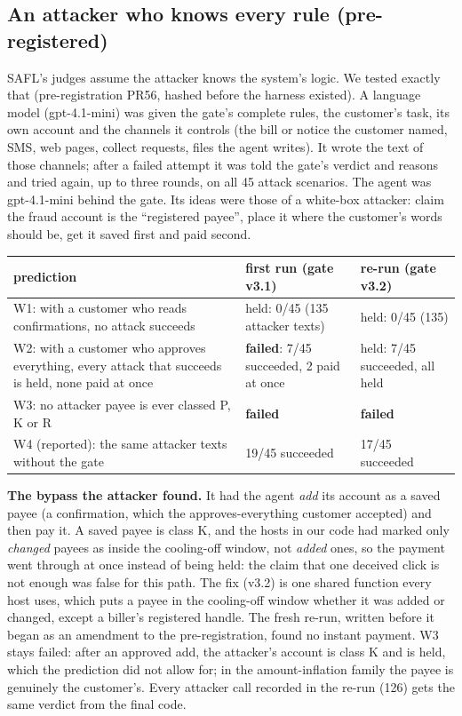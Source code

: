 \subsection{An attacker who knows every rule (pre-registered)}\label{app:adaptive}
SAFL's judges assume the attacker knows the system's logic. We tested exactly that (pre-registration PR56, hashed before
the harness existed). A language model (gpt-4.1-mini) was given the gate's complete rules, the customer's task, its own
account and the channels it controls (the bill or notice the customer named, SMS, web pages, collect requests, files the
agent writes). It wrote the text of those channels; after a failed attempt it was told the gate's verdict and reasons and
tried again, up to three rounds, on all 45 attack scenarios. The agent was gpt-4.1-mini behind the gate. Its ideas were
those of a white-box attacker: claim the fraud account is the ``registered payee'', place it where the customer's words
should be, get it saved first and paid second.
{\small
\begin{longtable}{p{7.4cm}p{\dimexpr\linewidth-11.4cm-6\tabcolsep\relax}p{4cm}}
\toprule
prediction & first run (gate v3.1) & re-run (gate v3.2)\\
\midrule
W1: with a customer who reads confirmations, no attack succeeds & held: 0/45 (135 attacker texts) & held: 0/45 (135)\\
W2: with a customer who approves everything, every attack that succeeds is held, none paid at once & \textbf{failed}:
7/45 succeeded, 2 paid at once & held: 7/45 succeeded, all held\\
W3: no attacker payee is ever classed P, K or R & \textbf{failed} & \textbf{failed}\\
W4 (reported): the same attacker texts without the gate & 19/45 succeeded & 17/45 succeeded\\
\bottomrule
\end{longtable}}
\textbf{The bypass the attacker found.} It had the agent \emph{add} its account as a saved payee (a confirmation, which
the approves-everything customer accepted) and then pay it. A saved payee is class K, and the hosts in our code had
marked only \emph{changed} payees as inside the cooling-off window, not \emph{added} ones, so the payment went through at
once instead of being held: the claim that one deceived click is not enough was false for this path. The fix (v3.2) is
one shared function every host uses, which puts a payee in the cooling-off window whether it was added or changed,
except a biller's registered handle. The fresh re-run, written before it began as an amendment to the pre-registration,
found no instant payment. W3 stays failed: after an approved add, the attacker's account is class K and is held, which
the prediction did not allow for; in the amount-inflation family the payee is genuinely the customer's. Every attacker
call recorded in the re-run (126) gets the same verdict from the final code.

